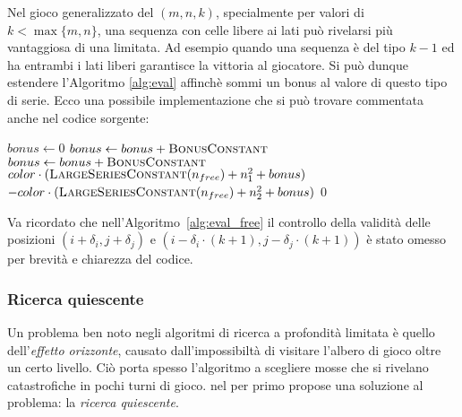 \documentclass{article}
\begin{document}
Nel gioco generalizzato del $(m, n, k)$, specialmente per valori di $k < \max\{m,n\}$,
una sequenza con celle libere ai lati pu\`o rivelarsi pi\`u vantaggiosa di una
limitata. Ad esempio quando una sequenza \`e del tipo $k-1$ ed ha entrambi i lati liberi
garantisce la vittoria al giocatore. Si pu\`o dunque estendere l'Algoritmo
\vref{alg:eval} affinch\`e sommi un bonus al valore di questo tipo di serie. 
Ecco una possibile implementazione che si pu\`o trovare
commentata anche nel codice sorgente:

\begin{algorithm}[H]
  \caption{Valutazione delle serie favorendo spazi liberi adiacenti}
  \label{alg:eval_free}
  \begin{algorithmic}[0]
    \State $bonus \gets 0$
      \State $bonus \gets bonus + \textsc{BonusConstant}$
    \EndIf
      \State $bonus \gets bonus + \textsc{BonusConstant}$
    \EndIf
    \Statex
      \State \Return $color \cdot (\Call{LargeSeriesConstant}{n_{free}} + n_1^2 + bonus)$
    \State \Return $-color \cdot (\Call{LargeSeriesConstant}{n_{free}} + n_2^2 + bonus)$
    \Else
      \State \Return $0$
    \EndIf
    \EndProcedure
  \end{algorithmic}
\end{algorithm}

Va ricordato che nell'Algoritmo~\ref{alg:eval_free} il controllo della validit\`a delle
posizioni $(i + \delta_i, j + \delta_j)$ e $(i - \delta_i \cdot (k+1), j - \delta_j \cdot (k+1))$
\`e stato omesso per brevit\`a e chiarezza del codice.

\subsubsection*{Ricerca quiescente}

Un problema ben noto negli algoritmi di ricerca a profondit\`a limitata \`e
quello dell'\emph{effetto orizzonte}, causato dall'impossibilt\`a 
di visitare l'albero di gioco oltre un certo livello. Ci\`o porta spesso l'algoritmo a scegliere 
mosse che si rivelano catastrofiche in pochi turni di gioco. 
\citeauthor{quiescence} nel \citeyear{quiescence} per primo propose una soluzione 
al problema: la \emph{ricerca quiescente}. %
\end{document}
